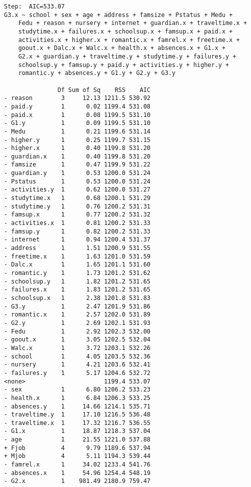 \documentclass[11pt]{article}
\begin{document}
\begin{enumerate}
\begin{verbatim}
Step:  AIC=533.07
G3.x ~ school + sex + age + address + famsize + Pstatus + Medu + 
    Fedu + reason + nursery + internet + guardian.x + traveltime.x + 
    studytime.x + failures.x + schoolsup.x + famsup.x + paid.x + 
    activities.x + higher.x + romantic.x + famrel.x + freetime.x + 
    goout.x + Dalc.x + Walc.x + health.x + absences.x + G1.x + 
    G2.x + guardian.y + traveltime.y + studytime.y + failures.y + 
    schoolsup.y + famsup.y + paid.y + activities.y + higher.y + 
    romantic.y + absences.y + G1.y + G2.y + G3.y

               Df Sum of Sq    RSS    AIC
- reason        3     12.13 1211.5 530.92
- paid.y        1      0.02 1199.4 531.08
- paid.x        1      0.08 1199.5 531.10
- G1.y          1      0.09 1199.5 531.10
- Medu          1      0.21 1199.6 531.14
- higher.y      1      0.25 1199.7 531.15
- higher.x      1      0.40 1199.8 531.20
- guardian.x    1      0.40 1199.8 531.20
- famsize       1      0.47 1199.9 531.22
- guardian.y    1      0.53 1200.0 531.24
- Pstatus       1      0.53 1200.0 531.24
- activities.y  1      0.62 1200.0 531.27
- studytime.x   1      0.68 1200.1 531.29
- studytime.y   1      0.76 1200.2 531.31
- famsup.x      1      0.77 1200.2 531.32
- activities.x  1      0.81 1200.2 531.33
- famsup.y      1      0.82 1200.2 531.33
- internet      1      0.94 1200.4 531.37
- address       1      1.51 1200.9 531.55
- freetime.x    1      1.63 1201.0 531.59
- Dalc.x        1      1.65 1201.1 531.60
- romantic.y    1      1.73 1201.2 531.62
- schoolsup.y   1      1.82 1201.2 531.65
- failures.x    1      1.83 1201.2 531.65
- schoolsup.x   1      2.38 1201.8 531.83
- G3.y          1      2.47 1201.9 531.86
- romantic.x    1      2.57 1202.0 531.89
- G2.y          1      2.69 1202.1 531.93
- Fedu          1      2.92 1202.3 532.00
- goout.x       1      3.05 1202.5 532.04
- Walc.x        1      3.72 1203.1 532.26
- school        1      4.05 1203.5 532.36
- nursery       1      4.21 1203.6 532.41
- failures.y    1      5.17 1204.6 532.72
<none>                      1199.4 533.07
- sex           1      6.80 1206.2 533.23
- health.x      1      6.84 1206.3 533.25
- absences.y    1     14.66 1214.1 535.71
- traveltime.y  1     17.10 1216.5 536.48
- traveltime.x  1     17.32 1216.7 536.55
- G1.x          1     18.87 1218.3 537.04
- age           1     21.55 1221.0 537.88
+ Fjob          4      9.79 1189.6 537.94
+ Mjob          4      5.11 1194.3 539.44
- famrel.x      1     34.02 1233.4 541.76
- absences.x    1     54.96 1254.4 548.19
- G2.x          1    981.49 2180.9 759.47


\end{verbatim}
\end{enumerate}
\end{document}
